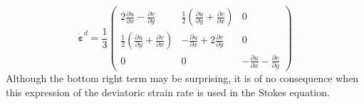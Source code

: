 \[
\dot{\bm \varepsilon}^d=
\frac{1}{3}
\left(
\begin{array}{ccc}
2 \frac{\partial u}{\partial x} - \frac{\partial v}{\partial y} &  
 \frac{1}{2}\left(\frac{\partial u}{\partial y} + \frac{\partial v}{\partial x}\right) &
0 \\ 
 \frac{1}{2}\left(\frac{\partial u}{\partial y} + \frac{\partial v}{\partial x}\right) &
- \frac{\partial u}{\partial x} +2 \frac{\partial v}{\partial y} &  
0 \\ 
0 & 0 & -\frac{\partial u}{\partial x} - \frac{\partial v}{\partial y}
\end{array}
\right)
\]
Although the bottom right term may be surprising, it is of no consequence when this expression of the deviatoric strain rate
is used in the Stokes equation. 



